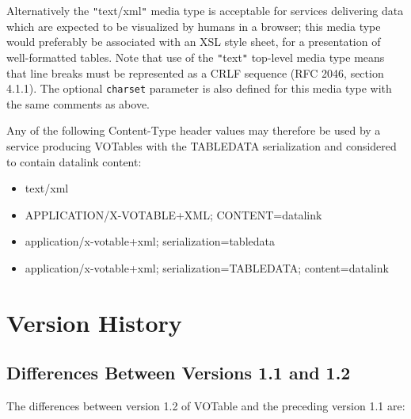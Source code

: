 \documentclass[11pt,a4paper]{ivoa}
\let\fg=\color
\def\literalvalue#1{{\tt"}{{\fg{DarkPurple}#1}}{\tt"}}
\begin{document}
Alternatively the {\literalvalue{\textsf{text/xml}}} media type is acceptable
for services delivering data which are expected to be
visualized by humans in a browser; this media type
would preferably be associated with an XSL style sheet,
for a presentation of well-formatted tables.
Note that use of the \literalvalue{\textsf{text}}
top-level media type means that
line breaks must be represented as a CRLF sequence
(RFC 2046, section 4.1.1).
The optional \texttt{charset} parameter is also defined for this
media type with the same comments as above.

Any of the following Content-Type header values may therefore be used
by a service producing VOTables with the TABLEDATA serialization
and considered to contain datalink content:
\begin{itemize}
  \item {\textsf{text/xml}}
  \item {\textsf{APPLICATION/X-VOTABLE+XML; CONTENT=datalink}}
  \item {\textsf{application/x-votable+xml; serialization=tabledata}}
  \item {\textsf{application/x-votable+xml; serialization=TABLEDATA; content=datalink}}
\end{itemize}


\section{Version History}
\label{diff}

\subsection{Differences Between Versions 1.1 and 1.2}
\label{diff1.1-1.2}
The differences between version 1.2 of VOTable and the preceding
version 1.1 are:
\end{document}
